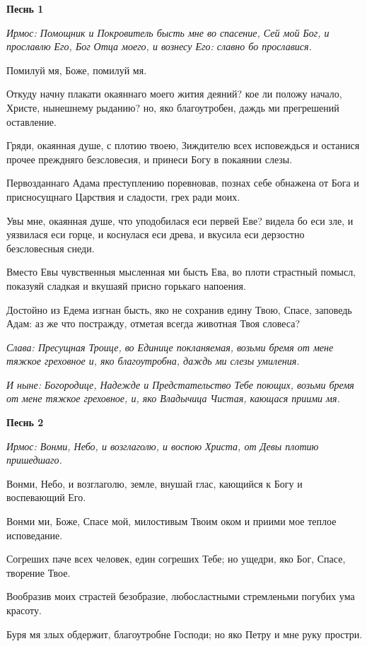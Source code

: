 \bfseries Песнь 1\normalfont{}

\itshape Ирмос\normalfont{}: Помощник и Покровитель бысть мне во спасение, Сей мой Бог, и прославлю Его, Бог Отца моего, и вознесу Его: славно бо прославися. 

Помилуй мя, Боже, помилуй мя. 

Откуду начну плакати окаяннаго моего жития деяний? кое ли положу начало, Христе, нынешнему рыданию? но, яко благоутробен, даждь ми прегрешений оставление. 

Гряди, окаянная душе, с плотию твоею, Зиждителю всех исповеждься и останися прочее преждняго безсловесия, и принеси Богу в покаянии слезы. 

Первозданнаго Адама преступлению поревновав, познах себе обнажена от Бога и присносущнаго Царствия и сладости, грех ради моих. 

Увы мне, окаянная душе, что уподобилася еси первей Еве? видела бо еси зле, и уязвилася еси горце, и коснулася еси древа, и вкусила еси дерзостно безсловесныя снеди. 

Вместо Евы чувственныя мысленная ми бысть Ева, во плоти страстный помысл, показуяй сладкая и вкушаяй присно горькаго напоения. 

Достойно из Едема изгнан бысть, яко не сохранив едину Твою, Спасе, заповедь Адам: аз же что постражду, отметая всегда животная Твоя словеса? 

\itshape Слава\normalfont{}: Пресущная Троице, во Единице покланяемая, возьми бремя от мене тяжкое греховное и, яко благоутробна, даждь ми слезы умиления. 

\itshape И ныне\normalfont{}: Богородице, Надежде и Предстательство Тебе поющих, возьми бремя от мене тяжкое греховное, и, яко Владычица Чистая, кающася приими мя. 

\medskip\bfseries Песнь 2\normalfont{}

\itshape Ирмос\normalfont{}: Вонми, Небо, и возглаголю, и воспою Христа, от Девы плотию пришедшаго. 

Вонми, Небо, и возглаголю, земле, внушай глас, кающийся к Богу и воспевающий Его. 

Вонми ми, Боже, Спасе мой, милостивым Твоим оком и приими мое теплое исповедание. 

Согреших паче всех человек, един согреших Тебе; но ущедри, яко Бог, Спасе, творение Твое. 

Вообразив моих страстей безобразие, любосластными стремленьми погубих ума красоту. 

Буря мя злых обдержит, благоутробне Господи; но яко Петру и мне руку простри. 

